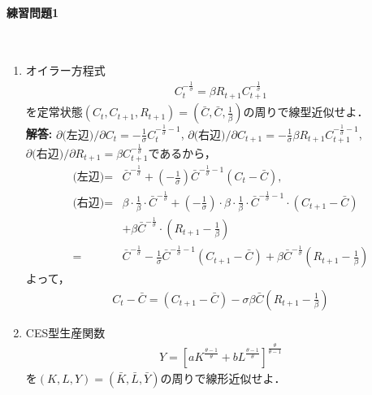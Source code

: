 \documentclass[a4paper,12pt,onecolumn,oneside,notitlepage,final]{article}
\begin{document}
\paragraph{練習問題1}~\\
\begin{enumerate}
\item オイラー方程式
\begin{align*}
C_t^{-\frac{1}{\sigma}} = \beta R_{t+1} C_{t+1}^{-\frac{1}{\sigma}}
\end{align*}
を定常状態$(C_t, C_{t+1}, R_{t+1}) = (\bar C, \bar C, \frac{1}{\beta})$の周りで線型近似せよ．\\

{\bf 解答:} $\partial \text{(左辺)}/\partial C_t = -\frac{1}{\sigma} C_t^{-\frac{1}{\sigma}-1}$, $\partial \text{(右辺)}/\partial C_{t+1} = -\frac{1}{\sigma} \beta R_{t+1} C_{t+1}^{-\frac{1}{\sigma}-1}$, $\partial \text{(右辺)}/\partial R_{t+1} = \beta C_{t+1}^{-\frac{1}{\sigma}}$であるから，
\begin{align*}
\text{(左辺)} = &\bar C^{-\frac{1}{\sigma}} + \left(-\frac{1}{\sigma}\right)\bar C^{-\frac{1}{\sigma}-1} (C_t - \bar C), \\
\text{(右辺)} = &\beta \cdot \frac{1}{\beta} \cdot \bar C^{-\frac{1}{\sigma}} + \left(-\frac{1}{\sigma}\right)\cdot \beta \cdot \frac{1}{\beta}\cdot\bar C^{-\frac{1}{\sigma}-1} \cdot (C_{t+1} - \bar C) \\
&+ \beta \bar C^{-\frac{1}{\sigma}}\cdot \left(R_{t+1} - \frac{1}{\beta}\right) \\
= &\bar C^{-\frac{1}{\sigma}} -\frac{1}{\sigma}\bar C^{-\frac{1}{\sigma}-1} (C_{t+1} - \bar C) + \beta \bar C^{-\frac{1}{\sigma}} (R_{t+1} - \frac{1}{\beta})
\end{align*}
よって，
\begin{align*}
C_t - \bar C = (C_{t+1}-\bar C) - \sigma \beta \bar C (R_{t+1} - \frac{1}{\beta})
\end{align*}


\item CES型生産関数
\begin{align*}
Y = [a K^\frac{\theta -1}{\theta} + b L^\frac{\theta -1}{\theta}]^{\frac{\theta}{\theta -1}}
\end{align*}
を$(K,L,Y)=(\bar K, \bar L, \bar Y)$の周りで線形近似せよ．\\


\end{enumerate}
\end{document}
